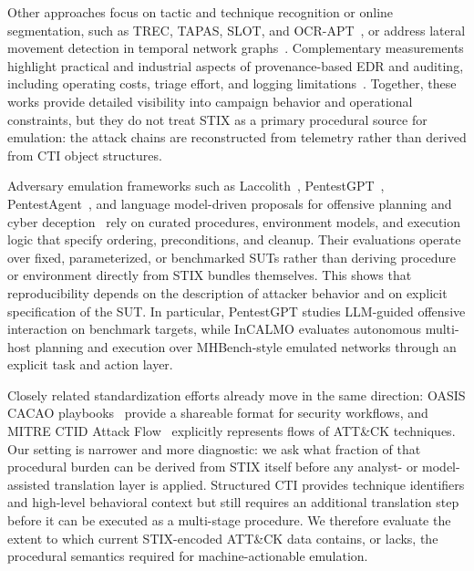 \documentclass[sigconf]{acmart}
\newcommand{\stix}{STIX\xspace}
\newcommand{\attack}{ATT\&CK\xspace}
\begin{document}
Other approaches focus on tactic and technique recognition or online segmentation, such as TREC, TAPAS, SLOT, and OCR-APT~\cite{lv2024trec,zhang2025tapas,qiao2025slot,aly2025ocrapt}, or address lateral movement detection in temporal network graphs~\cite{king2023euler,khoury2024jbeil}. Complementary measurements highlight practical and industrial aspects of provenance-based EDR and auditing, including operating costs, triage effort, and logging limitations~\cite{dong2023arewe,jiang2023auditing}. Together, these works provide detailed visibility into campaign behavior and operational constraints, but they do not treat \stix{} as a primary procedural source for emulation: the attack chains are reconstructed from telemetry rather than derived from CTI object structures.

Adversary emulation frameworks such as Laccolith~\cite{orbinato2024laccolith}, PentestGPT~\cite{deng2024pentestgpt}, PentestAgent~\cite{shen2025pentestagent}, and language model-driven proposals for offensive planning and cyber deception~\cite{singer2025incalmo,singer2025perry} rely on curated procedures, environment models, and execution logic that specify ordering, preconditions, and cleanup. Their evaluations operate over fixed, parameterized, or benchmarked SUTs rather than deriving procedure or environment directly from \stix{} bundles themselves. This shows that reproducibility depends on the description of attacker behavior and on explicit specification of the SUT. In particular, PentestGPT studies LLM-guided offensive interaction on benchmark targets, while InCALMO evaluates autonomous multi-host planning and execution over MHBench-style emulated networks through an explicit task and action layer.

Closely related standardization efforts already move in the same direction: OASIS CACAO playbooks~\cite{cacao2spec} provide a shareable format for security workflows, and MITRE CTID Attack Flow~\cite{attackflowctid} explicitly represents flows of \attack{} techniques. Our setting is narrower and more diagnostic: we ask what fraction of that procedural burden can be derived from \stix{} itself before any analyst- or model-assisted translation layer is applied. Structured CTI provides technique identifiers and high-level behavioral context but still requires an additional translation step before it can be executed as a multi-stage procedure. We therefore evaluate the extent to which current \stix{}-encoded \attack{} data contains, or lacks, the procedural semantics required for machine-actionable emulation.
\end{document}
